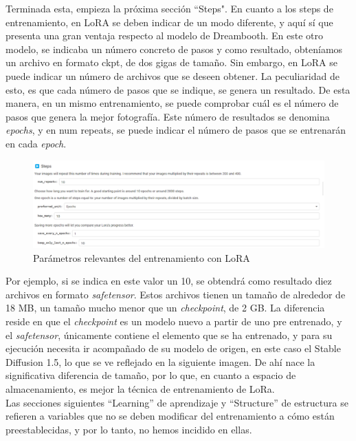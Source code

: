 Terminada esta, empieza la próxima sección ``Steps".
En cuanto a los steps de entrenamiento, en LoRA se deben indicar de un modo diferente, y aquí sí que presenta una gran ventaja respecto al modelo de Dreambooth. En este otro modelo, se indicaba un número concreto de pasos y como resultado, obteníamos un archivo en formato ckpt, de dos gigas de tamaño. Sin embargo, en LoRA se puede indicar un número de archivos que se deseen obtener. La peculiaridad de esto, es que cada número de pasos que se indique, se genera un resultado. De esta manera, en un mismo entrenamiento, se puede comprobar cuál es el número de pasos que genera la mejor fotografía. Este número de resultados se denomina \textit{epochs}, y en num repeats, se puede indicar el número de pasos que se entrenarán en cada \textit{epoch}. \\

\begin{figure}[h]
	\centering
	\includegraphics[width = 1.2
	\textwidth]{Imagenes/Vectorial/lora.png}
	\caption{Parámetros relevantes del entrenamiento con LoRA}
	\label{fig:lora}
\end{figure}

Por ejemplo, si se indica en este valor un 10, se obtendrá como resultado diez archivos en formato \textit{safetensor}. Estos archivos tienen un tamaño de alrededor de 18 MB, un tamaño mucho menor que un \textit{checkpoint}, de 2 GB. La diferencia reside en que el \textit{checkpoint} es un modelo nuevo a partir de uno pre entrenado, y el \textit{safetensor}, únicamente contiene el elemento que se ha entrenado, y para su ejecución necesita ir acompañado de su modelo de origen, en este caso el Stable Diffusion 1.5, lo que se ve reflejado en la siguiente imagen. De ahí nace la significativa diferencia de tamaño, por lo que, en cuanto a espacio de almacenamiento, es mejor la técnica de entrenamiento de LoRa. \\


Las secciones siguientes ``Learning'' de aprendizaje y ``Structure'' de estructura se refieren a variables que no se deben modificar del entrenamiento a cómo están preestablecidas, y por lo tanto, no hemos incidido en ellas.

